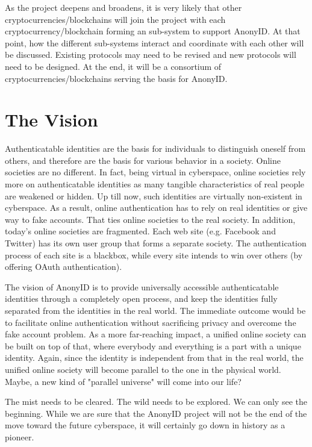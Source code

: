 \documentclass[12pt, a4paper]{article}
\begin{document}
As the project deepens and broadens, it is very likely that other cryptocurrencies/blockchains will join the project with each cryptocurrency/blockchain forming an sub-system to support AnonyID. At that point, how the different sub-systems interact and coordinate with each other will be discussed. Existing protocols may need to be revised and new protocols will need to be designed. At the end, it will be a consortium of cryptocurrencies/blockchains serving the basis for AnonyID.


\section{The Vision}

Authenticatable identities are the basis for individuals to distinguish oneself from others, and therefore are the basis for various behavior in a society. Online societies are no different. In fact, being virtual in cyberspace, online societies rely more on authenticatable identities as many tangible characteristics of real people are weakened or hidden. Up till now, such identities are virtually non-existent in cyberspace. As a result, online authentication has to rely on real identities or give way to fake accounts. That ties online societies to the real society. In addition, today's online societies are fragmented. Each web site (e.g. Facebook and Twitter) has its own user group that forms a separate society. The authentication process of each site is a blackbox, while every site intends to win over others (by offering OAuth authentication). 

The vision of AnonyID is to provide universally accessible authenticatable identities through a completely open process, and keep the identities fully separated from the identities in the real world. The immediate outcome would be to facilitate online authentication without sacrificing privacy and overcome the fake account problem. As a more far-reaching impact, a unified online society can be built on top of that, where everybody and everything is a part with a unique identity. Again, since the identity is independent from that in the real world, the unified online society will become parallel to the one in the physical world. Maybe, a new kind of "parallel universe" will come into our life?

The mist needs to be cleared. The wild needs to be explored. We can only see the beginning. While we are sure that the AnonyID project will not be the end of the move toward the future cyberspace, it will certainly go down in history as a pioneer. 
\end{document}
